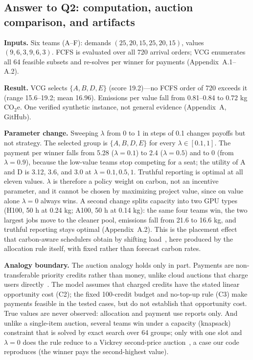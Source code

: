 \subsection{Answer to Q2: computation, auction comparison, and artifacts}

\noindent
\textbf{Inputs.} Six teams (A--F): demands $(25,20,15,25,20,15)$, values $(9,6,3,9,6,3)$. FCFS is evaluated over all 720 arrival orders; VCG enumerates all 64 feasible subsets and re-solves per winner for payments (Appendix~A.1--A.2).

\textbf{Result.} VCG selects $\{A,B,D,E\}$ (score 19.2)---no FCFS order of 720 exceeds it (range 15.6–19.2; mean 16.96). Emissions per value fall from 0.81--0.84 to 0.72 kg CO$_2$e. One verified synthetic instance, not general evidence (Appendix~A, GitHub).

\vspace{3pt}

\noindent
\textbf{Parameter change.} Sweeping $\lambda$ from 0 to 1 in steps of 0.1 changes payoffs but not strategy. The selected group is $\{A,B,D,E\}$ for every $\lambda\in[0.1,1]$. The payment per winner falls from 5.28 ($\lambda=0.1$) to 2.4 ($\lambda=0.5$) and to 0 (from $\lambda=0.9$), because the low-value teams stop competing for a seat; the utility of A and D is 3.12, 3.6, and 3.0 at $\lambda=0.1, 0.5, 1$. Truthful reporting is optimal at all eleven values. $\lambda$ is therefore a policy weight on carbon, not an incentive parameter, and it cannot be chosen by maximizing project value, since on value alone $\lambda=0$ always wins. A second change splits capacity into two GPU types (H100, 50 h at 0.24 kg; A100, 50 h at 0.14 kg): the same four teams win, the two largest jobs move to the cleaner pool, emissions fall from 21.6 to 16.6 kg, and truthful reporting stays optimal (Appendix~A.2). This is the placement effect that carbon-aware schedulers obtain by shifting load~\cite{radovanovic2021carbon}, here produced by the allocation rule itself, with fixed rather than forecast carbon rates.

\vspace{3pt}

\noindent
\textbf{Analogy boundary.} The auction analogy holds only in part. Payments are non-transferable priority credits rather than money, unlike cloud auctions that charge users directly~\cite{zhang2015iaas}. The model assumes that charged credits have the stated linear opportunity cost (C2); the fixed 100-credit budget and no-top-up rule (C3) make payments feasible in the tested cases, but do not establish that opportunity cost. True values are never observed: allocation and payment use reports only. And unlike a single-item auction, several teams win under a capacity (knapsack) constraint that is solved by exact search over 64 groups; only with one slot and $\lambda=0$ does the rule reduce to a Vickrey second-price auction~\cite{vickrey1961}, a case our code reproduces (the winner pays the second-highest value).

